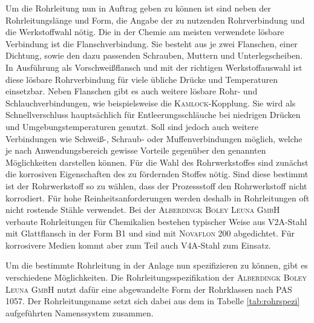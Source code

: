 Um die Rohrleitung nun in Auftrag geben zu können ist sind neben der Rohrleitungslänge und Form, die Angabe der zu nutzenden Rohrverbindung und die Werkstoffwahl nötig. Die in der Chemie am meisten verwendete lösbare Verbindung ist die Flanschverbindung. Sie besteht aus je zwei Flanschen, einer Dichtung, sowie den dazu passenden Schrauben, Muttern und Unterlegscheiben. In Ausführung als Vorschweißflansch und mit der richtigen Werkstoffauswahl ist diese lösbare Rohrverbindung für viele übliche Drücke und Temperaturen einsetzbar.  Neben Flanschen gibt es auch weitere lösbare Rohr- und Schlauchverbindungen, wie beispielsweise die \textsc{Kamlock}-Kopplung. Sie wird als Schnellverschluss hauptsächlich für Entleerungsschläuche bei niedrigen Drücken und Umgebungstemperaturen genutzt. Soll sind jedoch auch weitere Verbindungen wie Schweiß-, Schraub- oder Muffenverbindungen möglich, welche je nach Anwendungsbereich gewisse Vorteile gegenüber den genannten Möglichkeiten darstellen können.\cite{Ignatowitz.2015}\linebreak
Für die Wahl des Rohrwerkstoffes sind zunächst die korrosiven Eigenschaften des zu fördernden Stoffes nötig. Sind diese bestimmt ist der Rohrwerkstoff so zu wählen, dass der Prozessstoff den Rohrwerkstoff nicht korrodiert. Für hohe Reinheitsanforderungen werden deshalb in Rohrleitungen oft nicht rostende Stähle verwendet. \linebreak 
Bei der \textsc{Alberdingk Boley Leuna GmbH} verbaute Rohrleitungen für Chemikalien bestehen typischer Weise aus V2A-Stahl mit Glattflansch in der Form B1 und sind mit \textsc{Novaflon} 200 abgedichtet. Für korrosivere Medien kommt aber zum Teil auch V4A-Stahl zum Einsatz.

Um die bestimmte Rohrleitung in der Anlage nun spezifizieren zu können, gibt es verschiedene Möglichkeiten. Die Rohrleitungsspezifikation der \textsc{Alberdingk Boley Leuna GmbH} nutzt dafür eine abgewandelte Form der Rohrklassen nach PAS\,1057. Der Rohrleitungsname setzt sich dabei aus dem in Tabelle \ref{tab:rohrspezi} aufgeführten Namenssystem zusammen.

